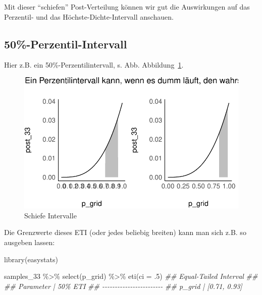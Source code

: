 \documentclass[
  a4paper,
  DIV=11]{scrreprt}
\newenvironment{Shaded}{\begin{snugshade}}{\end{snugshade}}
\newcommand{\AttributeTok}[1]{\textcolor[rgb]{0.40,0.45,0.13}{#1}}
\newcommand{\DecValTok}[1]{\textcolor[rgb]{0.68,0.00,0.00}{#1}}
\newcommand{\DocumentationTok}[1]{\textcolor[rgb]{0.37,0.37,0.37}{\textit{#1}}}
\newcommand{\FunctionTok}[1]{\textcolor[rgb]{0.28,0.35,0.67}{#1}}
\newcommand{\NormalTok}[1]{\textcolor[rgb]{0.00,0.23,0.31}{#1}}
\newcommand{\SpecialCharTok}[1]{\textcolor[rgb]{0.37,0.37,0.37}{#1}}
\theoremstyle{definition}
\theoremstyle{remark}
\begin{document}
Mit dieser ``schiefen'' Post-Verteilung können wir gut die Auswirkungen
auf das Perzentil- und das Höchste-Dichte-Intervall anschauen.

\hypertarget{perzentil-intervall}{%
\subsection{50\%-Perzentil-Intervall}\label{perzentil-intervall}}

Hier z.B. ein 50\%-Perzentilintervall, s. Abb.
Abbildung~\ref{fig-schief}.

\begin{figure}

{\centering \includegraphics{./Post_files/figure-pdf/fig-schief-1.pdf}

}

\caption{\label{fig-schief}Schiefe Intervalle}

\end{figure}

Die Grenzwerte dieses ETI (oder jedes beliebig breiten) kann man sich
z.B. so ausgeben lassen:

\begin{Shaded}
\begin{Highlighting}[]
\FunctionTok{library}\NormalTok{(easystats)}

\NormalTok{samples\_33 }\SpecialCharTok{\%\textgreater{}\%} 
  \FunctionTok{select}\NormalTok{(p\_grid) }\SpecialCharTok{\%\textgreater{}\%} 
  \FunctionTok{eti}\NormalTok{(}\AttributeTok{ci =}\NormalTok{ .}\DecValTok{5}\NormalTok{)}
\DocumentationTok{\#\# Equal{-}Tailed Interval}
\DocumentationTok{\#\# }
\DocumentationTok{\#\# Parameter |      50\% ETI}
\DocumentationTok{\#\# {-}{-}{-}{-}{-}{-}{-}{-}{-}{-}{-}{-}{-}{-}{-}{-}{-}{-}{-}{-}{-}{-}{-}{-}}
\DocumentationTok{\#\# p\_grid    | [0.71, 0.93]}
\end{Highlighting}
\end{Shaded}
\end{document}
